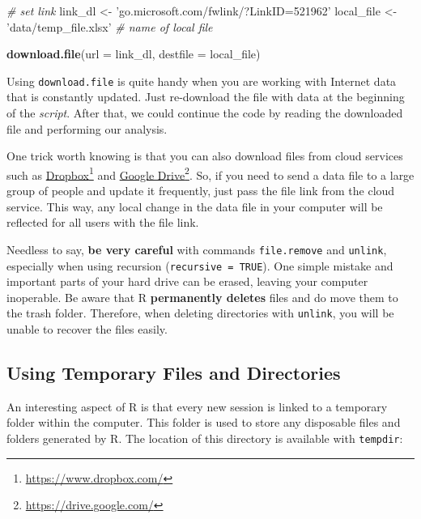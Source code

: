 \documentclass[
  12pt,
]{book}
\newenvironment{Shaded}{\begin{snugshade}}{\end{snugshade}}
\newcommand{\CommentTok}[1]{\textcolor[rgb]{0.37,0.37,0.37}{\textit{#1}}}
\newcommand{\DataTypeTok}[1]{\textcolor[rgb]{0.27,0.27,0.27}{#1}}
\newcommand{\KeywordTok}[1]{\textcolor[rgb]{0.27,0.27,0.27}{\textbf{#1}}}
\newcommand{\NormalTok}[1]{#1}
\newcommand{\StringTok}[1]{\textcolor[rgb]{0.5,0.5,0.5}{#1}}
\newenvironment{rmdcaution}
{\begin{cautionblock}
		
	} {\end{cautionblock}}
\begin{document}
\begin{Shaded}
\begin{Highlighting}[]
\CommentTok{# set link}
\NormalTok{link_dl <-}\StringTok{ 'go.microsoft.com/fwlink/?LinkID=521962'}
\NormalTok{local_file <-}\StringTok{ 'data/temp_file.xlsx'} \CommentTok{# name of local file}

\KeywordTok{download.file}\NormalTok{(}\DataTypeTok{url =}\NormalTok{ link_dl,}
              \DataTypeTok{destfile =}\NormalTok{ local_file)}
\end{Highlighting}
\end{Shaded}

Using \texttt{download.file} is quite handy when you are working with Internet data that is constantly updated. Just re-download the file with data at the beginning of the \emph{script}. After that, we could continue the code by reading the downloaded file and performing our analysis.

One trick worth knowing is that you can also download files from cloud services such as \href{https://www.dropbox.com/}{Dropbox}\footnote{\url{https://www.dropbox.com/}} and \href{https://drive.google.com/}{Google Drive}\footnote{\url{https://drive.google.com/}}. So, if you need to send a data file to a large group of people and update it frequently, just pass the file link from the cloud service. This way, any local change in the data file in your computer will be reflected for all users with the file link.

\begin{rmdcaution}
Needless to say, \textbf{be very careful} with commands
\texttt{file.remove} and \texttt{unlink}, especially when using
recursion (\texttt{recursive\ =\ TRUE}). One simple mistake and
important parts of your hard drive can be erased, leaving your computer
inoperable. Be aware that R \textbf{permanently deletes} files and do
move them to the trash folder. Therefore, when deleting directories with
\texttt{unlink}, you will be unable to recover the files easily.
\end{rmdcaution}

\hypertarget{using-temporary-files-and-directories}{%
\subsection{Using Temporary Files and Directories}\label{using-temporary-files-and-directories}}

An interesting aspect of R is that every new session is linked to a temporary folder within the computer. This folder is used to store any disposable files and folders generated by R. The location of this directory is available with \texttt{tempdir}:
\end{document}
